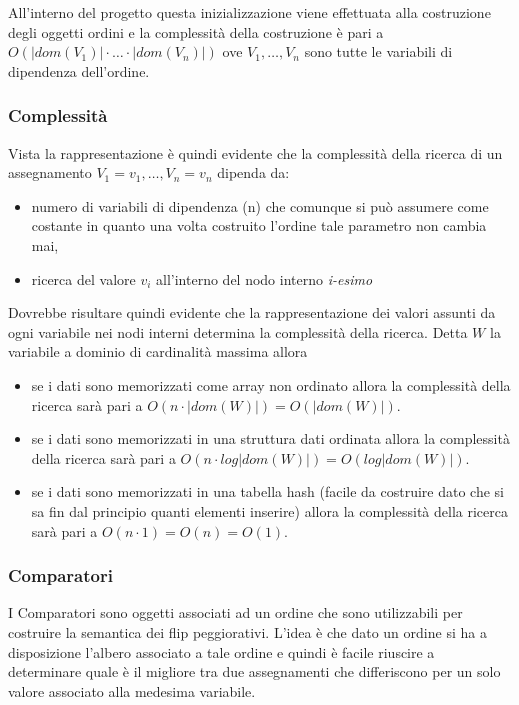 All'interno del progetto questa inizializzazione viene effettuata alla
costruzione degli oggetti ordini e la complessità della costruzione è
pari a $O(|dom(V_1)| \cdot \dots \cdot |dom(V_n)|)$ ove $ V_1, \dots, V_n $
sono tutte le variabili di dipendenza dell'ordine.

\subsubsection{Complessità}
Vista la rappresentazione è quindi evidente che la complessità della
ricerca di un assegnamento $ V_1=v_1, \dots, V_n=v_n $ dipenda da:

\begin{itemize}
\item numero di variabili di dipendenza (n) che comunque si può
  assumere come costante in quanto una volta costruito l'ordine tale
  parametro non cambia mai,
\item ricerca del valore $v_i$ all'interno del nodo interno
  \textit{i-esimo}
\end{itemize}

Dovrebbe risultare quindi evidente che la rappresentazione dei valori
assunti da ogni variabile nei nodi interni determina la complessità
della ricerca. Detta $W$ la variabile a dominio di cardinalità massima
allora
\begin{itemize}
\item se i dati sono memorizzati come array non ordinato allora la
  complessità della ricerca sarà pari a $O(n \cdot
  |dom(W)|)=O(|dom(W)|)$.
\item se i dati sono memorizzati in una struttura dati ordinata allora
  la complessità della ricerca sarà pari a $O(n \cdot
  log|dom(W)|)=O(log|dom(W)|)$.
\item se i dati sono memorizzati in una tabella hash (facile da
  costruire dato che si sa fin dal principio quanti elementi inserire)
  allora la complessità della ricerca sarà pari a $O(n \cdot
  1)=O(n)=O(1)$.
\end{itemize}

\subsubsection{Comparatori}
\label{sect:comparatori}
I Comparatori sono oggetti associati ad un ordine che sono
utilizzabili per costruire la semantica dei flip peggiorativi. L'idea
è che dato un ordine si ha a disposizione l'albero associato a tale
ordine e quindi è facile riuscire a determinare quale è il migliore
tra due assegnamenti che differiscono per un solo valore associato
alla medesima variabile.

